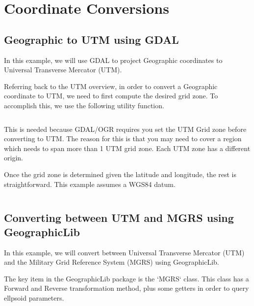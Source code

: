 %



\section*{Coordinate Conversions}


\subsection*{Geographic to UTM using GDAL}

In this example, we will use GDAL to project Geographic coordinates to Universal Transverse
Mercator (UTM).  

Referring back to the UTM overview, in order to convert a Geographic coordinate
to UTM, we need to first compute the desired grid zone.  To accomplish this, we use
the following utility function. 

\inputminted[firstline=95,lastline=125]{C++}{../code/common/Coordinate_Utilities.cpp}

This is needed because GDAL/OGR requires you set the UTM Grid zone before converting to UTM.  
The reason for this is that you may need to cover a region which needs to span more than 1 UTM grid zone.
Each UTM zone has a different origin.

Once the grid zone is determined given the latitude and longitude, the rest is straightforward.  This example
assumes a WGS84 datum. 

\inputminted{C++}{../code/chapter3/gdal-geographic-to-utm.cpp}


\subsection*{Converting between UTM and MGRS using GeographicLib}

In this example, we will convert between Universal Transverse Mercator (UTM) and the Military Grid Reference System (MGRS)
using GeographicLib. 

The key item in the GeographicLib package is the `MGRS` class.  This class has a Forward and Reverse 
transformation method, plus some getters in order to query ellpsoid parameters. 



\inputminted[firstline=20,lastline=66]{C++}{../code/chapter3/mgrs_to_utm.cpp}


